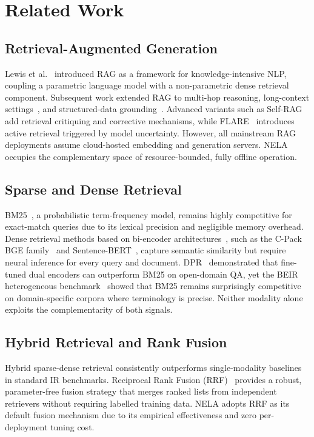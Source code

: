 \documentclass[conference]{IEEEtran}
\begin{document}
\section{Related Work}

\subsection{Retrieval-Augmented Generation}
Lewis et al.~\cite{b2} introduced RAG as a framework for knowledge-intensive
NLP, coupling a parametric language model with a non-parametric dense
retrieval component. Subsequent work extended RAG to multi-hop reasoning,
long-context settings~\cite{b17}, and structured-data grounding~\cite{b18}.
Advanced variants such as Self-RAG~\cite{b19} add retrieval critiquing and
corrective mechanisms, while FLARE~\cite{b20} introduces active retrieval
triggered by model uncertainty. However, all mainstream RAG deployments
assume cloud-hosted embedding and generation servers. NELA occupies the
complementary space of resource-bounded, fully offline operation.

\subsection{Sparse and Dense Retrieval}
BM25~\cite{b3}, a probabilistic term-frequency model, remains highly
competitive for exact-match queries due to its lexical precision and
negligible memory overhead. Dense retrieval methods based on bi-encoder
architectures~\cite{b21}, such as the C-Pack BGE family~\cite{b4} and
Sentence-BERT~\cite{b22}, capture semantic similarity but require neural
inference for every query and document. DPR~\cite{b21} demonstrated that
fine-tuned dual encoders can outperform BM25 on open-domain QA, yet the
BEIR heterogeneous benchmark~\cite{b23} showed that BM25 remains surprisingly
competitive on domain-specific corpora where terminology is precise.
Neither modality alone exploits the complementarity of both signals.

\subsection{Hybrid Retrieval and Rank Fusion}
Hybrid sparse-dense retrieval consistently outperforms single-modality
baselines in standard IR benchmarks. Reciprocal Rank Fusion (RRF)~\cite{b5}
provides a robust, parameter-free fusion strategy that merges ranked lists
from independent retrievers without requiring labelled training data. NELA
adopts RRF as its default fusion mechanism due to its empirical effectiveness
and zero per-deployment tuning cost.
\end{document}
